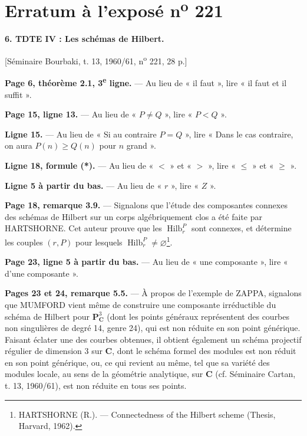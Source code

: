 \clearpage
\chapter*{Erratum à l'exposé n\textsuperscript{o} 221}
\setcounter{footnote}{3}

\noindent\textbf{6. TDTE IV : Les schémas de Hilbert.}

\begin{center}
[Séminaire Bourbaki, t. 13, 1960/61, n\textsuperscript{o} 221, 28 p.]
\end{center}

\noindent\textbf{Page 6, théorème 2.1, 3\textsuperscript{e} ligne.} --- Au lieu
de « il faut », lire « il faut et il suffit ».

\noindent\textbf{Page 15, ligne 13.} --- Au lieu de « $P\neq Q$ », lire
« $P<Q$ ».

\noindent\textbf{Ligne 15.} --- Au lieu de « Si au contraire $P=Q$ », lire
« Dans le cas contraire, on aura $P(n)\geq Q(n)$ pour $n$ grand ».

\noindent\textbf{Ligne 18, formule (*).} --- Au lieu de « $<$ » et « $>$ »,
lire « $\leq$ » et « $\geq$ ».

\noindent\textbf{Ligne 5 à partir du bas.} --- Au lieu de « $r$ », lire
« $Z$ ».

\noindent\textbf{Page 18, remarque 3.9.} --- Signalons que l'étude des
composantes connexes des schémas de Hilbert sur un corps algébriquement clos a
été faite par HARTSHORNE. Cet auteur prouve que les
$\operatorname{Hilb}^{P}_{r}$ sont connexes, et détermine les couples $(r,P)$
pour lesquels $\operatorname{Hilb}^{P}_{r}\neq\varnothing$\footnote{HARTSHORNE
(R.). --- Connectedness of the Hilbert scheme (Thesis, Harvard, 1962).}.

\noindent\textbf{Page 23, ligne 5 à partir du bas.} --- Au lieu de « une
composante », lire « d'une composante ».

\noindent\textbf{Pages 23 et 24, remarque 5.5.} --- À propos de l'exemple de
ZAPPA, signalons que MUMFORD vient même de construire une composante
irréductible du schéma de Hilbert pour $\mathbf P^3_{\mathbf C}$ (dont les
points généraux représentent des courbes non singulières de degré 14, genre
24), qui est non réduite en son point générique. Faisant éclater une des
courbes obtenues, il obtient également un schéma projectif régulier de
dimension 3 sur $\mathbf C$, dont le schéma formel des modules est non réduit
en son point générique, ou, ce qui revient au même, tel que sa variété des
modules locale, au sens de la géométrie analytique, sur $\mathbf C$ (cf.
Séminaire Cartan, t. 13, 1960/61), est non réduite en tous ses points.

